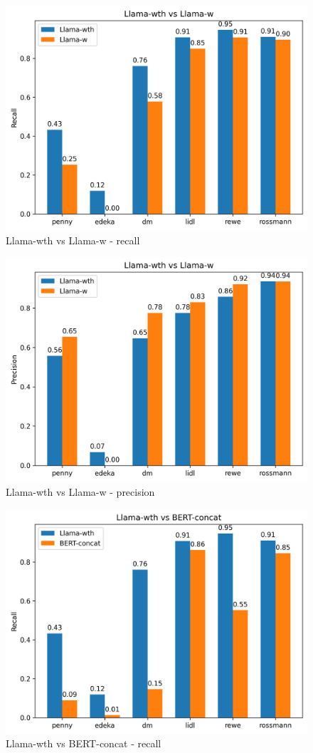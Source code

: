 \documentclass[licencjacka,en]{pracamgr}
\begin{document}
\begin{appendices}
\begin{figure}[h]
    \centering
    \includegraphics[width=0.8\linewidth]{bachelor_images/benchmark/llama_wth_vs_w_recall.png}
    \caption{Llama-wth vs Llama-w - recall}
    \label{fig:llama_wth_vs_w_recall}
\end{figure}

\begin{figure}[h]
    \centering
    \includegraphics[width=0.8\linewidth]{bachelor_images/benchmark/llama_wth_vs_w_precision.png}
    \caption{Llama-wth vs Llama-w - precision}
    \label{fig:llama_wth_vs_w_precision}
\end{figure}

\begin{figure}[h]
    \centering
    \includegraphics[width=0.8\linewidth]{bachelor_images/benchmark/llama_vs_bert_recall.png}
    \caption{Llama-wth vs BERT-concat - recall}
    \label{fig:llama_vs_bert_recall}
\end{figure}


\end{appendices}
\end{document}
